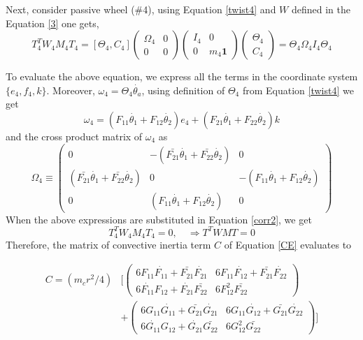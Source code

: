 Next, consider passive wheel (\#4), using Equation \ref{twist4} and  $W$ defined in the Equation \ref{3} one gets,
\begin{equation}
\label{corr2}
T^T_4W_4M_4T_4=[\Theta_4, C_4]\begin{pmatrix}
\Omega_4 &0\\0&0
\end{pmatrix}
\begin{pmatrix}
I_4&0\\0 &m_4 \mathbf{1}
\end{pmatrix}
\begin{pmatrix}
\Theta_4\\C_4
\end{pmatrix}=\Theta_4\Omega_4I_4\Theta_4
\end{equation}

To evaluate the above equation, we express  all the terms in the coordinate system $\{{e_4,f_4,k}\}$. Moreover, $\omega_4=\Theta_4 \dot{\theta_a}$, using definition of $\Theta_4$ from Equation \ref{twist4} we get \[\omega_4= (F_{11}\dot{\theta_1}+F_{12}\dot{\theta_2})e_4+(F_{21}\dot{\theta_1}+F_{22}\dot{\theta_2})k\] and the cross product matrix of $\omega_4$ as 
\[
 \Omega_4 \equiv \begin{pmatrix}
 0& -(\bar{F_{21}}\dot{\theta_1}+\bar{F_{22}}\dot{\theta_2}) &0\\
 (\bar{F_{21}}\dot{\theta_1}+\bar{F_{22}}\dot{\theta_2}) & 0 & -(F_{11}\dot{\theta_1}+F_{12}\dot{\theta_2}) \\
 0& (F_{11}\dot{\theta_1}+F_{12}\dot{\theta_2}) &0 
 \end{pmatrix}
\]
When the above expressions are substituted in Equation  \ref{corr2}, we get
\begin{equation}
T^T_4W_4M_4T_4=0, \quad \Rightarrow T^TWMT=0
\end{equation} 
Therefore, the matrix of convective inertia term $C$ of Equation \ref{CE}  evaluates to 

\begin{equation}
\label{C_final}
\begin{split}
C=
(m_cr^2/4)& \biggl[ \begin{pmatrix}
6F_{11}\dot{F_{11}}+\bar{F_{21}}\dot{F_{21}} & 6F_{11}\dot{F_{12}}+\bar{F_{21}}\dot{F_{22}}\\
6\dot{F_{11}}F_{12}+\dot{F_{21}}\bar{F_{22}} & 6F_{12}^2\bar{F_{22}}
\end{pmatrix}\\
&+\begin{pmatrix}
6G_{11}\dot{G_{11}}+\bar{G_{21}}\dot{G_{21}} & 6G_{11}\dot{G_{12}}+\bar{G_{21}}\dot{G_{22}}\\
6\dot{G_{11}}G_{12}+\dot{G_{21}}\bar{G_{22}} & 6G_{12}^2\bar{G_{22}}
\end{pmatrix} \biggr]
\end{split}
\end{equation}

